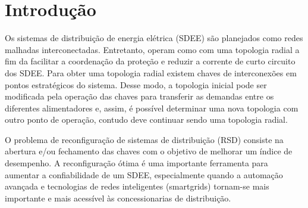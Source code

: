 \section{Introdução}

Os sistemas de distribuição de energia elétrica (SDEE) são planejados como redes malhadas interconectadas.
Entretanto, operam como com uma topologia radial a fim da facilitar a coordenação da proteção e reduzir a corrente de curto circuito dos SDEE.
Para obter uma topologia radial existem chaves de interconexões em pontos estratégicos do sistema.
Desse modo, a topologia inicial pode ser modificada pela operação das chaves para transferir as demandas entre os diferentes alimentadores e, assim, é possível determinar uma nova topologia com outro ponto de operação, contudo deve continuar sendo uma topologia radial.

O problema de reconfiguração de sistemas de distribuição (RSD) consiste na abertura e/ou fechamento das chaves com o objetivo de melhorar um índice de desempenho. 
A reconfiguração ótima é uma importante ferramenta para aumentar a confiabilidade de um SDEE, especialmente quando a automação avançada e tecnologias de redes inteligentes (smartgrids) tornam-se mais importante e mais acessível às concessionarias de distribuição.





